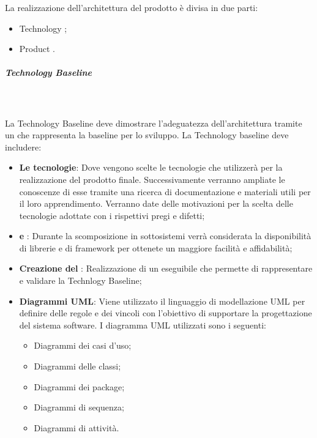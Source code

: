 La realizzazione dell’architettura del prodotto è divisa in due parti:
\begin{itemize}
	\item Technology ;
	\item Product .
\end{itemize}

\subparagraph{Technology Baseline}\mbox{}\\ \\
La Technology Baseline deve dimostrare l’adeguatezza dell’architettura tramite un  che rappresenta la baseline per lo sviluppo. 
La Technology baseline deve includere:
\begin{itemize}
	\item \textbf{Le tecnologie}: Dove vengono scelte le tecnologie che \Gruppo{} utilizzerà per la realizzazione del prodotto finale. Successivamente verranno ampliate le conoscenze di esse tramite una ricerca di documentazione e materiali utili per il loro apprendimento. Verranno date delle motivazioni per la scelta delle tecnologie adottate con i rispettivi pregi e difetti;
	\item \textbf{ e }: Durante la scomposizione in sottosistemi verrà considerata la disponibilità di librerie e di framework per ottenete un maggiore facilità e affidabilità;
	\item \textbf{Creazione del }: Realizzazione di un eseguibile che permette di rappresentare e validare la Technlogy Baseline;
	\item \textbf{Diagrammi UML}: Viene utilizzato il linguaggio di modellazione UML per definire delle regole e dei vincoli con l'obiettivo di supportare la progettazione del sistema software. I diagramma UML utilizzati sono i seguenti:
	\begin{itemize}
		\item Diagrammi dei casi d'uso; 
		\item Diagrammi delle classi; 
		\item Diagrammi dei package;
		\item Diagrammi di sequenza; 
		\item Diagrammi di attività.
	\end{itemize}
\end{itemize}


